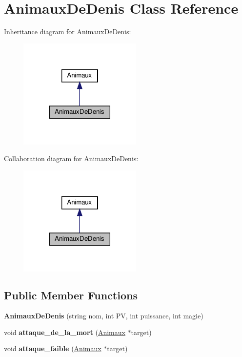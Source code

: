 \hypertarget{classAnimauxDeDenis}{}\section{Animaux\+De\+Denis Class Reference}
\label{classAnimauxDeDenis}


Inheritance diagram for Animaux\+De\+Denis\+:
\nopagebreak
\begin{figure}[H]
\begin{center}
\leavevmode
\includegraphics[width=173pt]{classAnimauxDeDenis__inherit__graph}
\end{center}
\end{figure}


Collaboration diagram for Animaux\+De\+Denis\+:
\nopagebreak
\begin{figure}[H]
\begin{center}
\leavevmode
\includegraphics[width=173pt]{classAnimauxDeDenis__coll__graph}
\end{center}
\end{figure}
\subsection*{Public Member Functions}
\begin{DoxyCompactItemize}
\item 
\mbox{\label{classAnimauxDeDenis_a56245bce148da0875882b24da0ee43c7}} 
{\bfseries Animaux\+De\+Denis} (string nom, int PV, int puissance, int magie)
\item 
\mbox{\label{classAnimauxDeDenis_ad0bf041f421e1dfdcda5fe70e5c2074f}} 
void {\bfseries attaque\+\_\+de\+\_\+la\+\_\+mort} (\hyperlink{classAnimaux}{Animaux} $\ast$target)
\item 
\mbox{\label{classAnimauxDeDenis_a3b50240079636df486a11e942f8fe39d}} 
void {\bfseries attaque\+\_\+faible} (\hyperlink{classAnimaux}{Animaux} $\ast$target)
\end{DoxyCompactItemize}
